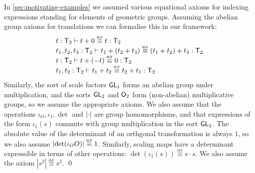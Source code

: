 \begin{example*}
  \label{ex:two-dim-geo-axioms}
  In \autoref{sec:motivating-examples} we assumed 
  various equational axioms %
  for indexing expressions standing for
  elements of geometric groups. Assuming the abelian group axioms for
  translations we can formalise this in our %
  framework:
  \begin{displaymath}
    \begin{array}{l}
      t : \mathsf{T}_2 \vdash t + 0 \stackrel{ax}\equiv t : \mathsf{T}_2 \\
      t_1, t_2, t_3 : \mathsf{T}_2 \vdash t_1 + (t_2 + t_3) \stackrel{ax}\equiv (t_1 + t_2) + t_3 : \mathsf{T}_2 \\
      t : \mathsf{T}_2 \vdash t + (-t) \stackrel{ax}\equiv 0 : \mathsf{T}_2 \\
      t_1, t_2 : \mathsf{T}_2 \vdash t_1 + t_2 \stackrel{ax}\equiv t_2 + t_1 : \mathsf{T}_2 \\
    \end{array}
  \end{displaymath}
  Similarly, the sort of scale factors $\mathsf{GL}_1$ forms an abelian
  group under multiplication, and the sorts $\mathsf{GL}_2$ and
  $\mathsf{O}_2$ form (non-abelian) multiplicative groups, so we assume
  the appropriate axioms. We also assume that the operations $\iota_O,
  \iota_1, \det$ and $\lvert \cdot \rvert$ are group homomorphisms, and that
  expressions of the form $\iota_1(s)$ commute with group
  multiplication in the sort $\mathsf{GL}_2$. The absolute value of the
  determinant of an orthgonal transformation is always $1$, so we also
  assume $\lvert \det(\iota_OO) \rvert \stackrel{ax}\equiv 1$. Similarly,
  scaling maps have a determinant expressible in terms of other
  operations: $\det(\iota_1(s)) \stackrel{ax}\equiv s \cdot s$. We
  also assume the axiom $|s^2| \stackrel{ax}\equiv s^2$.  \qed
\end{example*}

